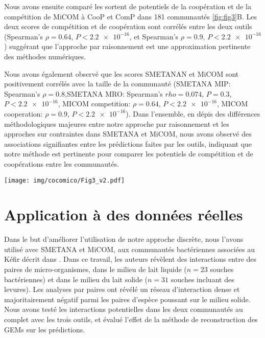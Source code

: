 Nous avons ensuite comparé les sortent de potentiels de la coopération et de la compétition de MiCOM à \textsf{CooP} et \textsf{ComP} dans 181 communautés \ref{fig:fig3}B. Les deux scores de compétition et de coopération sont corrélés entre les deux outils (Spearman's $\rho = 0.64$, $P < \num{2.2e-16}$, et Spearman's $\rho = 0.9$, $P < \num{2.2e-16}$) suggérant que l'approche par raisonnement est une approximation pertinente des méthodes numériques.

Nous avons également observé que les scores SMETANAN et MiCOM sont positivement corrélés avec la taille de la communauté (SMETANA MIP: Spearman's $\rho = 0.8$,SMETANA MRO: Spearman's $rho = 0.074$, $P = 0.3$, $P < \num{2.2e-16}$, MICOM competition: $\rho = 0.64$, $P < \num{2.2e-16}$, MICOM cooperation: $\rho = 0.9$, $P < \num{2.2e-16}$). Dans l'ensemble, en dépis des différences méthodologiques majeures entre notre approche par raisonnement et les approches sur contraintes dans SMETANA et MiCOM, nous avons observé des associations signifiantes entre les prédictions faites par les outils, indiquant que notre méthode est pertinente pour comparer les potentiels de compétition et de coopérations entre les communautés.

\begin{figure*}
    \centering
    \texttt{[image: img/cocomico/Fig3\_v2.pdf]}
    \caption{\textbf{Comparison of our approach predictions to SMETANA and MICOM.}
    (\textbf{A.}) Comparison to SMETANA on 250 communities of size ranging from 3 to 30. \textsf{ComP} is compared to SMETANA metabolic resource overlap (MRO), and \textsf{CooP} to SMETANA metabolic interaction potential (MIP).
    (\textbf{B.}) Comparison to MICOM's sums of pairwise positive and negative growth impact scores on 188 real metagenomic communities (size 16 to 98 species).}
    \label{fig:fig3}
\end{figure*}

\section{Application à des données réelles}
 Dans le but d'améliorer l'utilisation de notre approche discrète, nous l'avons utilisé avec SMETANA et MiCOM, aux communautés bactériennes associées au Kéfir décrit dans \citep{Blasche.2021}. Dans ce travail, les auteurs révèlent des interactions entre des paires de micro-organismes, dans le milieu de lait liquide ($n = 23$ souches bactériennes) et dans le milieu du lait solide ($n = 31$ souches incluant des levures). Les analyses par paires ont révélé un réseau d'interaction dense et majoritairement négatif parmi les paires d'espèce poussant sur le milieu solide. Nous avons testé les interactions potentielles dans les deux communautés au complet avec les trois outils, et évalué l'effet de la méthode de reconstruction des GEMs sur les prédictions.

